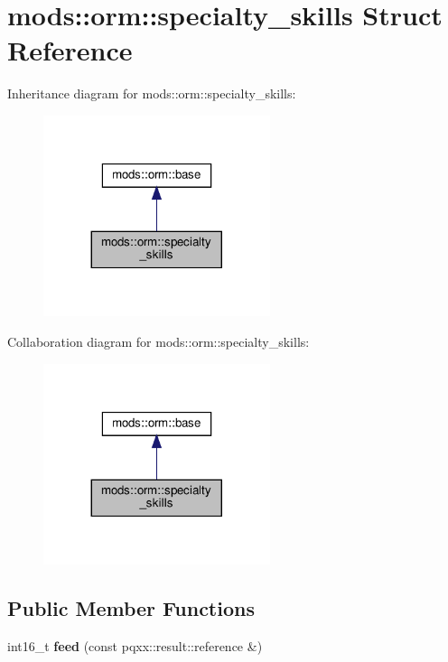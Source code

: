 \hypertarget{structmods_1_1orm_1_1specialty__skills}{}\section{mods\+:\+:orm\+:\+:specialty\+\_\+skills Struct Reference}
\label{structmods_1_1orm_1_1specialty__skills}


Inheritance diagram for mods\+:\+:orm\+:\+:specialty\+\_\+skills\+:\nopagebreak
\begin{figure}[H]
\begin{center}
\leavevmode
\includegraphics[width=188pt]{structmods_1_1orm_1_1specialty__skills__inherit__graph}
\end{center}
\end{figure}


Collaboration diagram for mods\+:\+:orm\+:\+:specialty\+\_\+skills\+:\nopagebreak
\begin{figure}[H]
\begin{center}
\leavevmode
\includegraphics[width=188pt]{structmods_1_1orm_1_1specialty__skills__coll__graph}
\end{center}
\end{figure}
\subsection*{Public Member Functions}
\begin{DoxyCompactItemize}
\item 
\mbox{\label{structmods_1_1orm_1_1specialty__skills_af7858364fe2a287791b7257aecc99013}} 
int16\+\_\+t {\bfseries feed} (const pqxx\+::result\+::reference \&)
\end{DoxyCompactItemize}
